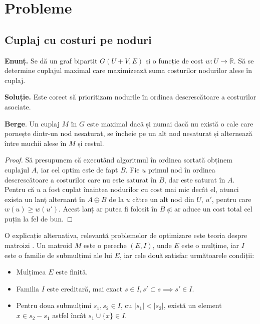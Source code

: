 \chapter{Probleme}

\section{Cuplaj cu costuri pe noduri}

\noindent \textbf{Enunț.} Se dă un graf bipartit $G(U + V, E)$ și o funcție de cost $w \colon U \to \mathbb{R}$. Să se determine cuplajul
maximal care maximizează suma costurilor nodurilor alese în cuplaj.

\noindent \textbf{Soluție.} Este corect să prioritizam nodurile în ordinea descrescătoare a costurilor asociate.

\begin{lem}
  \textbf{Berge}. Un cuplaj $M$ în $G$ este maximal dacă și numai dacă nu există o cale care pornește dintr-un nod nesaturat, se încheie pe un alt
  nod nesaturat și alternează între muchii alese în $M$ și restul.
\end{lem}

\begin{proof}
  Să presupunem că executând algoritmul în ordinea sortată obținem cuplajul $A$, iar cel optim este de fapt $B$.
  Fie $u$ primul nod în ordinea descrescătoare a costurilor care nu este saturat în $B$, dar este saturat în $A$.
  Pentru că $u$ a fost cuplat înaintea nodurilor cu cost mai mic decât el, atunci exista un lanț alternant în
  $A \oplus B$ de la $u$ către un alt nod din $U$, $u'$, pentru care $w(u) \geq w(u')$. Acest lanț ar putea fi folosit
  în $B$ și ar aduce un cost total cel puțin la fel de bun.
\end{proof}

O explicație alternativa, relevantă problemelor de optimizare este teoria despre matroizi \cite{matroid}. Un matroid $M$ este o pereche
$(E, I)$, unde $E$ este o mulțime, iar $I$ este o familie de submulțimi ale lui $E$, iar cele două satisfac următoarele condiții:

\begin{itemize}
  \item Mulțimea $E$ este finită.
  \item Familia $I$ este ereditară, mai exact $s \in I, s' \subset s \implies s' \in I$.
  \item Pentru doua submulțimi $s_{1}, s_{2} \in I$, cu $|s_{1}| < |s_{2}|$, există un element
    $x \in s_{2} - s_{1}$ astfel încât $s_{1} \cup \{x\} \in I$.
\end{itemize}

